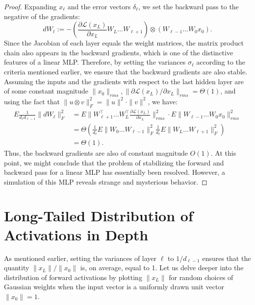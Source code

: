 \begin{proof}
Expanding \( x_\ell \) and the error vectors \( \delta_\ell \), we set the backward pass to the negative of the gradients:
\begin{equation}
dW_\ell := -\left(\frac{\partial \mathcal{L}(x_L)}{\partial x_L} W_L \dots W_{\ell+1} \right) \otimes \left(W_{\ell-1} \dots W_0 x_0\right).
\end{equation}
Since the Jacobian of each layer equals the weight matrices, the matrix product chain also appears in the backward gradients, which is one of the distinctive features of a linear MLP. Therefore, by setting the variances \( \sigma_\ell \) according to the criteria mentioned earlier, we ensure that the backward gradients are also stable. Assuming the inputs and the gradients with respect to the last hidden layer are of some constant magnitude \( \|x_0\|_{rms}, \|\partial \mathcal{L}(x_L)/\partial x_L\|_{rms} = \Theta(1) \), and using the fact that \( \|u \otimes v\|_F^2 = \|u\|^2 \cdot \|v\|^2 \), we have:
\begin{equation}
\begin{aligned}
E \frac{1}{d_\ell d_{\ell-1}}\|dW_\ell\|_F^2 &= E \|W_{\ell+1}^\top \dots W_L^\top \frac{\partial \mathcal{L}(x_L)}{\partial x_L} \|^2_{rms} \cdot E \|W_{\ell-1} \dots W_0 x_0\|^2_{rms} \\
&= \Theta\left(\frac{1}{d_\ell} E \|W_0 \dots W_{\ell-1}\|_F^2 \frac{1}{d_\ell} E \| W_L \dots W_{\ell+1}\|_F^2\right) \\
&= \Theta(1).
\end{aligned}
\end{equation}
Thus, the backward gradients are also of constant magnitude \( O(1) \). At this point, we might conclude that the problem of stabilizing the forward and backward pass for a linear MLP has essentially been resolved. However, a simulation of this MLP reveals strange and mysterious behavior.
\end{proof}

\section{Long-Tailed Distribution of Activations in Depth}

\begin{remark}
As mentioned earlier, setting the variances of layer \( \ell \) to \( 1/d_{\ell-1} \) ensures that the quantity \( \|x_L\|/\|x_0\| \) is, on average, equal to 1. Let us delve deeper into the distribution of forward activations by plotting \( \|x_L\| \) for random choices of Gaussian weights when the input vector is a uniformly drawn unit vector \( \|x_0\| = 1 \).
\end{remark}

